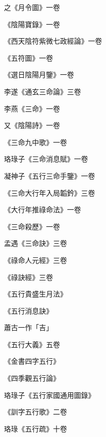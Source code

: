 \begin{pinyinscope}
 之《月令圖》一卷



 《陰陽寶錄》一卷



 《西天陰符紫微七政經論》一卷



 《五符圖》一卷



 《選日陰陽月鑒》一卷



 李遂《通玄三命論》三卷



 李燕《三命》一卷



 又《陰陽詩》一卷



 《三命九中歌》一卷



 珞琭子《三命消息賦》一卷



 凝神子《五行三命手鑒》一卷



 《三命大行年入局韜鈐》三卷



 《大行年推祿命法》一卷



 《三命殺歷》一卷



 孟遇《三命訣》三卷



 《祿命人元經》三卷



 《祿訣經》三卷



 《五行貴盛生月法》



 《五行消息訣》



 蕭古一作「吉」



 《五行大義》五卷



 《金書四字五行》



 《四季觀五行論》



 珞琭子《五行家國通用圖錄》



 《訓字五行歌》二卷



 珞琭《五行疏》十卷




\end{pinyinscope}
